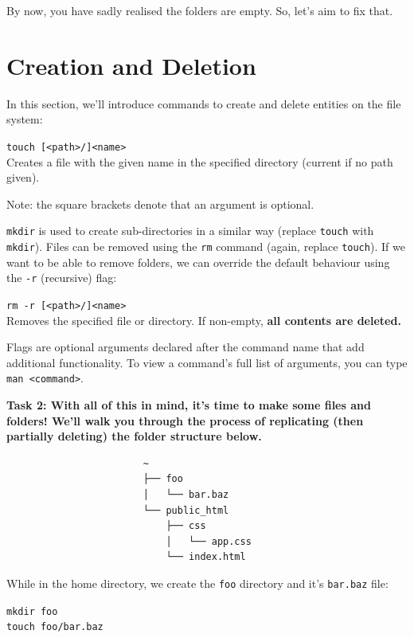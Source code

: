 \documentclass[a4paper,11pt,parskip=half-]{scrartcl}
\begin{document}
\newpage

By now, you have sadly realised the folders are empty. 
So, let's aim to fix that.

\section*{Creation and Deletion}

In this section, we'll introduce commands to create and delete entities on the file system:

\Large \texttt{touch [<path>/]<name>} \normalsize \\
Creates a file with the given name in the specified directory (current if no path given).

Note: the square brackets denote that an argument is optional.

\texttt{mkdir} is used to create sub-directories in a similar way (replace \texttt{touch} with \texttt{mkdir}).
Files can be removed using the \texttt{rm} command (again, replace \texttt{touch}). 
If we want to be able to remove folders, we can override the default behaviour using the \texttt{-r} (recursive) flag:

\Large \texttt{rm -r [<path>/]<name>} \normalsize \\
Removes the specified file or directory. 
If non-empty, \bfseries all contents are deleted. \normalfont 

Flags are optional arguments declared after the command name that add additional functionality. 
To view a command's full list of arguments, you can type \texttt{man <command>}.

\bfseries Task 2: \normalfont 
With all of this in mind, it’s time to make some files and folders! 
We'll walk you through the process of replicating (then partially deleting) the folder structure below.

\begin{verbatim}
                        ~
                        ├── foo
                        │   └── bar.baz
                        └── public_html
                            ├── css
                            │   └── app.css
                            └── index.html
\end{verbatim}

While in the home directory, we create the \texttt{foo} directory and it's \texttt{bar.baz} file:

\qquad \texttt{mkdir foo} \\
\qquad \texttt{touch foo/bar.baz}
\end{document}
